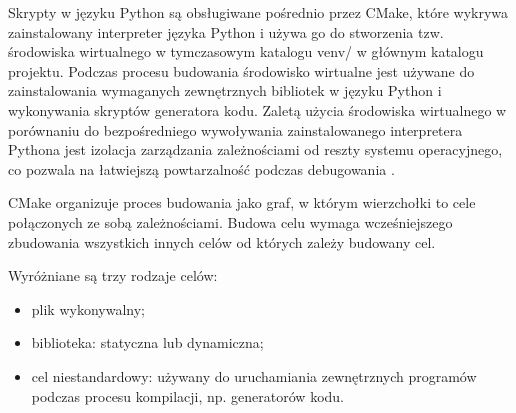 Skrypty w języku Python są obsługiwane pośrednio przez CMake, które wykrywa zainstalowany interpreter języka Python i
używa go do stworzenia tzw. środowiska wirtualnego w tymczasowym katalogu venv/ w głównym katalogu projektu. Podczas
procesu budowania środowisko wirtualne jest używane do zainstalowania wymaganych zewnętrznych bibliotek w języku Python
i wykonywania skryptów generatora kodu. Zaletą użycia środowiska wirtualnego w porównaniu do bezpośredniego wywoływania
zainstalowanego interpretera Pythona jest izolacja zarządzania zależnościami od reszty systemu operacyjnego, co pozwala
na łatwiejszą powtarzalność podczas debugowania \cite{PEP405}.

CMake organizuje proces budowania jako graf, w którym wierzchołki to cele połączonych ze sobą zależnościami. Budowa celu
wymaga wcześniejszego zbudowania wszystkich innych celów od których zależy budowany cel.

Wyróżniane są trzy rodzaje celów:
\begin{itemize}
	\item {plik wykonywalny};
	\item {biblioteka}: statyczna lub dynamiczna;
	\item {cel niestandardowy}: używany do uruchamiania zewnętrznych programów podczas procesu kompilacji, np. generatorów kodu.
\end{itemize}

